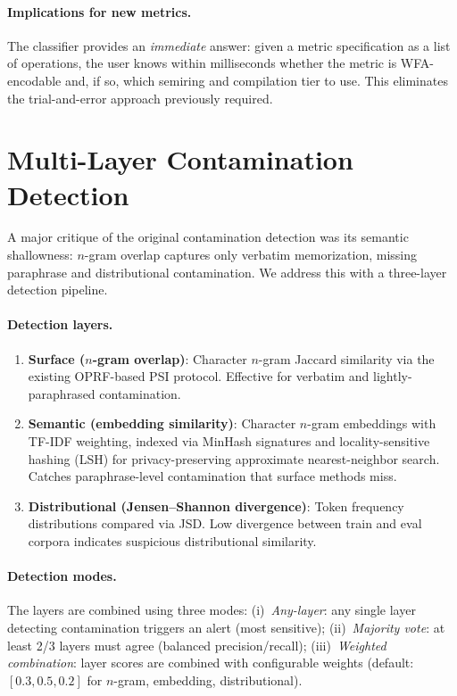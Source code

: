 \documentclass[11pt]{article}
\begin{document}
\paragraph{Implications for new metrics.}
The classifier provides an \emph{immediate} answer: given a metric
specification as a list of operations, the user knows within
milliseconds whether the metric is WFA-encodable and, if so, which
semiring and compilation tier to use.  This eliminates the
trial-and-error approach previously required.


\section{Multi-Layer Contamination Detection}\label{sec:multi-layer}

A major critique of the original contamination detection was its
semantic shallowness: $n$-gram overlap captures only verbatim
memorization, missing paraphrase and distributional contamination.
We address this with a three-layer detection pipeline.

\paragraph{Detection layers.}
\begin{enumerate}[nosep]
\item \textbf{Surface ($n$-gram overlap)}: Character $n$-gram Jaccard
  similarity via the existing OPRF-based PSI protocol.  Effective
  for verbatim and lightly-paraphrased contamination.
\item \textbf{Semantic (embedding similarity)}: Character $n$-gram
  embeddings with TF-IDF weighting, indexed via MinHash signatures
  and locality-sensitive hashing (LSH) for privacy-preserving
  approximate nearest-neighbor search.  Catches paraphrase-level
  contamination that surface methods miss.
\item \textbf{Distributional (Jensen--Shannon divergence)}: Token
  frequency distributions compared via JSD.  Low divergence between
  train and eval corpora indicates suspicious distributional similarity.
\end{enumerate}

\paragraph{Detection modes.}
The layers are combined using three modes:
(i)~\emph{Any-layer}: any single layer detecting contamination triggers
an alert (most sensitive);
(ii)~\emph{Majority vote}: at least 2/3 layers must agree
(balanced precision/recall);
(iii)~\emph{Weighted combination}: layer scores are combined with
configurable weights (default: $[0.3, 0.5, 0.2]$ for $n$-gram,
embedding, distributional).
\end{document}

